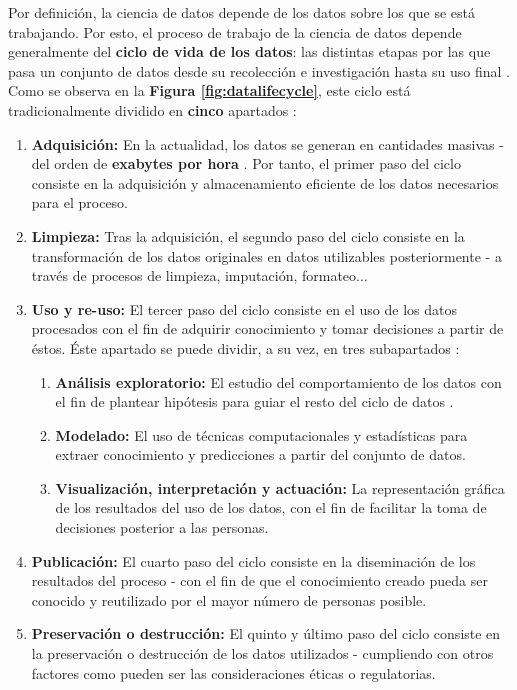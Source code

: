 Por definición, la ciencia de datos depende de los datos sobre los que se está trabajando. Por esto, el proceso de trabajo de la ciencia de datos depende generalmente del \textbf{ciclo de vida de los datos}: las distintas etapas por las que pasa un conjunto de datos desde su recolección e investigación hasta su uso final \cite{datasciencelifecycle}. Como se observa en la \textbf{Figura \ref{fig:datalifecycle}}, este ciclo está tradicionalmente dividido en \textbf{cinco} apartados \cite{potential}:



\begin{enumerate}
	\item \textbf{Adquisición:} En la actualidad, los datos se generan en cantidades masivas - del orden de \textbf{exabytes por hora} \cite{Wing2019Data}. Por tanto, el primer paso del ciclo consiste en la adquisición y almacenamiento eficiente de los datos necesarios para el proceso.
	\item \textbf{Limpieza:} Tras la adquisición, el segundo paso del ciclo consiste en la transformación de los datos originales en datos utilizables posteriormente - a través de procesos de limpieza, imputación, formateo...
	\item \textbf{Uso y re-uso:}  El tercer paso del ciclo consiste en el uso de los datos procesados con el fin de adquirir conocimiento y tomar decisiones a partir de éstos. Éste apartado se puede dividir, a su vez, en tres subapartados \cite{Wing2019Data}:
		\begin{enumerate}
			\item \textbf{Análisis exploratorio:} El estudio del comportamiento de los datos con el fin de plantear hipótesis para guiar el resto del ciclo de datos \cite{eda}.
			\item \textbf{Modelado:} El uso de técnicas computacionales y estadísticas para extraer conocimiento y predicciones a partir del conjunto de datos.
			\item \textbf{Visualización, interpretación y actuación:}  La representación gráfica de los resultados del uso de los datos, con el fin de facilitar la toma de decisiones posterior a las personas.
		\end{enumerate}
	\item \textbf{Publicación:} El cuarto paso del ciclo consiste en la diseminación de los resultados del proceso - con el fin de que el conocimiento creado pueda ser conocido y reutilizado por el mayor número de personas posible.
	\item \textbf{Preservación o destrucción:} El quinto y último paso del ciclo consiste en la preservación o destrucción de los datos utilizados - cumpliendo con otros factores como pueden ser las consideraciones éticas o regulatorias.
\end{enumerate}

